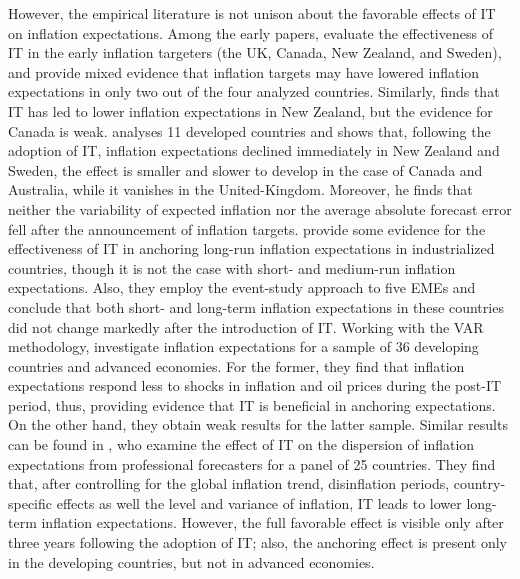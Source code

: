 \documentclass{article}
\begin{document}
However, the empirical literature is not unison about the favorable effects of IT on inflation expectations. Among the early papers, \citet{freeman1995} evaluate the effectiveness of IT in the early inflation targeters (the UK, Canada, New Zealand, and Sweden), and provide mixed evidence that inflation targets may have lowered inflation expectations in only two out of the four analyzed countries. Similarly, \citet{debelle1996} finds that IT has led to lower inflation expectations in New Zealand, but the evidence for Canada is weak. \citet{johnson2002} analyses 11 developed countries and shows that, following the adoption of IT, inflation expectations declined immediately in New Zealand and Sweden, the effect is smaller and slower to develop in the case of Canada and Australia, while it vanishes in the United-Kingdom. Moreover, he finds that neither the variability of expected inflation nor the average absolute forecast error fell after the announcement of inflation targets. \citet{levin2004} provide some evidence for the effectiveness of IT in anchoring long-run inflation expectations in industrialized countries, though it is not the case with short- and medium-run inflation expectations. Also, they employ the event-study approach to five EMEs and conclude that both short- and long-term inflation expectations in these countries did not change markedly after the introduction of IT. Working with the VAR methodology, \citet{davis2014} investigate inflation expectations for a sample of 36 developing countries and advanced economies. For the former, they find that inflation expectations respond less to shocks in inflation and oil prices during the post-IT period, thus, providing evidence that IT is beneficial in anchoring expectations. On the other hand, they obtain weak results for the latter sample. Similar results can be found in \citet{capistran2010}, who examine the effect of IT on the dispersion of inflation expectations from professional forecasters for a panel of 25 countries. They find that, after controlling for the global inflation trend, disinflation periods, country-specific effects as well the level and variance of inflation, IT leads to lower long-term inflation expectations. However, the full favorable effect is visible only after three years following the adoption of IT; also, the anchoring effect is present only in the developing countries, but not in advanced economies.
\end{document}
